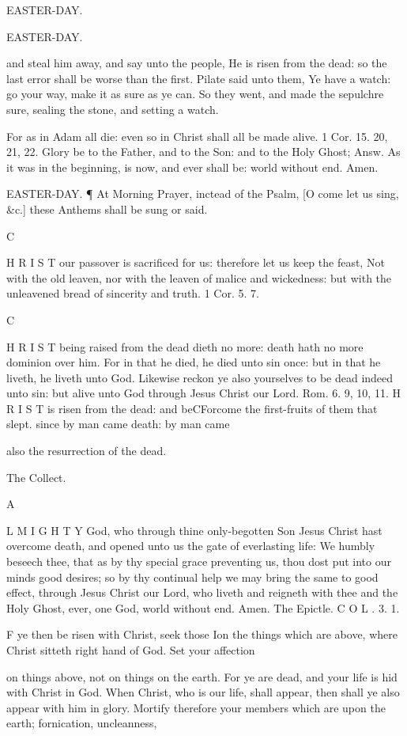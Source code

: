 EASTER-DAY.

EASTER-DAY.

and steal him away, and say unto the people, He is risen from the dead: so the last error shall be worse than the first. Pilate said unto them, Ye have a watch: go your way, make it as sure as ye can. So they went, and made the sepulchre sure, sealing the stone, and setting a watch.

For as in Adam all die: even so in Christ shall all be made alive. 1 Cor. 15. 20, 21, 22. Glory be to the Father, and to the Son: and to the Holy Ghost; Answ. As it was in the beginning, is now, and ever shall be: world without end. Amen.

EASTER-DAY. ¶ At Morning Prayer, inctead of the Psalm, [O come let us sing, \&c.] these Anthems shall be sung or said.

C

H R I S T our passover is sacrificed for us: therefore let us keep the feast, Not with the old leaven, nor with the leaven of malice and wickedness: but with the unleavened bread of sincerity and truth. 1 Cor. 5. 7.

C

H R I S T being raised from the dead dieth no more: death hath no more dominion over him. For in that he died, he died unto sin once: but in that he liveth, he liveth unto God. Likewise reckon ye also yourselves to be dead indeed unto sin: but alive unto God through Jesus Christ our Lord. Rom. 6. 9, 10, 11. H R I S T is risen from the dead: and beCForcome the first-fruits of them that slept. since by man came death: by man came

also the resurrection of the dead.

The Collect.

A

L M I G H T Y God, who through thine only-begotten Son Jesus Christ hast overcome death, and opened unto us the gate of everlasting life: We humbly beseech thee, that as by thy special grace preventing us, thou dost put into our minds good desires; so by thy continual help we may bring the same to good effect, through Jesus Christ our Lord, who liveth and reigneth with thee and the Holy Ghost, ever, one God, world without end. Amen. The Epictle. C O L . 3. 1.

F ye then be risen with Christ, seek those Ion the things which are above, where Christ sitteth right hand of God. Set your affection

on things above, not on things on the earth. For ye are dead, and your life is hid with Christ in God. When Christ, who is our life, shall appear, then shall ye also appear with him in glory. Mortify therefore your members which are upon the earth; fornication, uncleanness,

